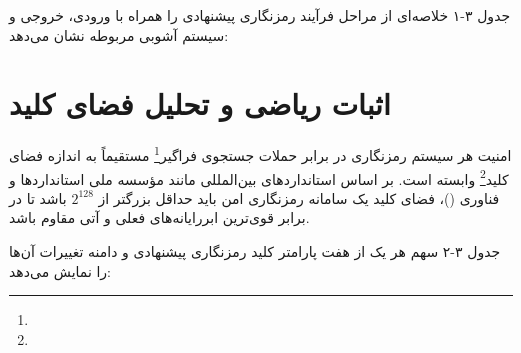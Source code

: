 جدول ۳-۱ خلاصه‌ای از مراحل فرآیند رمزنگاری پیشنهادی را همراه با ورودی، خروجی و سیستم آشوبی مربوطه نشان می‌دهد:

\begin{table}[htbp]
\centering
\small
{}
\caption{خلاصه مراحل الگوریتم رمزنگاری پیشنهادی}
\label{tab:ch3_summary}
\end{table}

\section{اثبات ریاضی و تحلیل فضای کلید}

امنیت هر سیستم رمزنگاری در برابر حملات جستجوی فراگیر\footnote{} مستقیماً به اندازه فضای کلید\footnote{} وابسته است. بر اساس استانداردهای بین‌المللی مانند مؤسسه ملی استانداردها و فناوری ()، فضای کلید یک سامانه رمزنگاری امن باید حداقل بزرگتر از $2^{128}$ باشد تا در برابر قوی‌ترین ابررایانه‌های فعلی و آتی مقاوم باشد.

جدول ۳-۲ سهم هر یک از هفت پارامتر کلید رمزنگاری پیشنهادی و دامنه تغییرات آن‌ها را نمایش می‌دهد:

